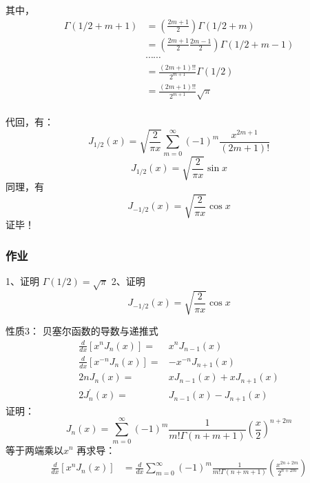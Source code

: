 \begin{frame}
	其中， 
	\begin{equation*}
		\begin{split}
			\Gamma(1/2+m+1) &= (\frac{2m+1}{2}) \Gamma(1/2+m) \\
			& = (\frac{2m+1}{2}\frac{2m-1}{2})  \Gamma(1/2+m-1) \\
			&\cdots \cdots \\
			& = \frac{(2m+1)!!}{2^{m+1}} \Gamma(1/2) \\
			& = \frac{(2m+1)!!}{2^{m+1}} \sqrt{\pi} \\
		\end{split}	
	\end{equation*}	
\end{frame}	

\begin{frame}
	代回，有：
	\begin{equation*}
		J_{1/2}(x) = \sqrt{\frac{2}{\pi x}} \sum\limits_{m=0}^{\infty} (-1)^m  \frac{x^{2m+1}}{(2m+1)!} 
	\end{equation*}	 
	\begin{equation*}
		J_{1/2}(x) = \sqrt{\frac{2}{\pi x}} \sin x  
	\end{equation*}	 
	同理，有  
	\begin{equation*}
		J_{-1/2}(x) = \sqrt{\frac{2}{\pi x}} \cos x  
	\end{equation*}	 
	\alert{证毕！} 
\end{frame}

\begin{frame}
	\frametitle{作业}
	1、证明 $\Gamma(1/2)=\sqrt{\pi}$
	2、证明
	\begin{equation*}
		J_{-1/2}(x) = \sqrt{\frac{2}{\pi x}} \cos x  
	\end{equation*}
\end{frame}

\begin{frame}
	\alert{性质3：} 贝塞尔函数的导数与递推式 \\
	\begin{equation*}
		\begin{split}
			\frac{d}{d x}\left[x^{n} J_{n}(x)\right]= &x^{n} J_{n-1}(x) \\
			\frac{d}{d x}\left[x^{-n} J_{n}(x)\right]=& -x^{-n} J_{n+1}(x) \\
			2 n J_{n}(x)=&xJ_{n-1}(x)+x J_{n+1}(x) \\
			2 J_{n}^{\prime}(x)=&J_{n-1}(x)-J_{n+1}(x)
		\end{split}
	\end{equation*}		
	\alert{证明：}
	\begin{equation*}
		J_n(x) = \sum\limits_{m=0}^{\infty} (-1)^m  \frac{1}{m! \Gamma(n+m+1) } (\frac{x}{2})^{n+2m} 
	\end{equation*}	 
	等于两端乘以$x^n$ 再求导：
	\begin{equation*}
	\begin{split}
		\frac{d}{dx} [x^n J_n(x)]&= \frac{d}{dx}\sum\limits_{m=0}^{\infty} (-1)^m  
		\frac{1}{m! \Gamma(n+m+1) } (\frac{x^{2n+2m}}{2^{n+2m}})\\	
	\end{split}
	\end{equation*}		
\end{frame}	

